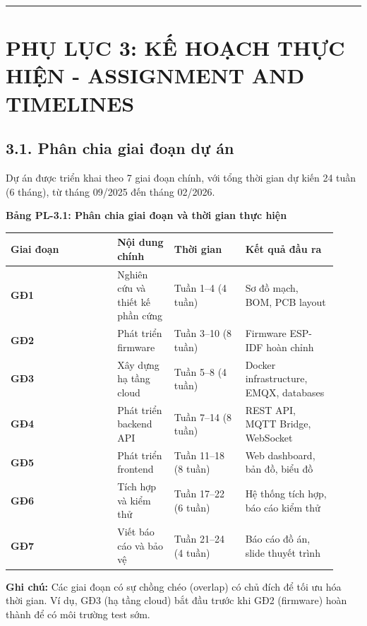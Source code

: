 \documentclass[13pt,a4paper]{extarticle}
\newcounter{none} %
\newcommand{\thesislongtableorignewline}{}
\let\thesislongtableorignewline\\
\renewcommand{\\}{\thesislongtableorignewline\hline}%
\let\\\thesislongtableorignewline
\newcommand{\appendixsection}[1]{\clearpage\section{#1}}
\newcommand{\thesistabletitle}[1]{%
  \begin{center}\textbf{#1}\end{center}%
}
\begin{document}
\begin{center}\rule{0.5\linewidth}{0.5pt}\end{center}

\appendixsection{PHỤ LỤC 3: KẾ HOẠCH THỰC HIỆN - ASSIGNMENT AND
TIMELINES}\label{phux1ee5-lux1ee5c-3-kux1ebf-houx1ea1ch-thux1ef1c-hiux1ec7n---assignment-and-timelines}

\subsection{3.1. Phân chia giai đoạn dự
án}\label{31-phuxe2n-chia-giai-ux111oux1ea1n-dux1ef1-uxe1n}

Dự án được triển khai theo 7 giai đoạn chính, với tổng thời gian dự kiến
24 tuần (6 tháng), từ tháng 09/2025 đến tháng 02/2026.

\thesistabletitle{Bảng PL-3.1: Phân chia giai đoạn và thời gian thực hiện}

{\def\LTcaptype{none} %
\begin{longtable}{|p{0.30\linewidth}|p{0.16\linewidth}|p{0.20\linewidth}|p{0.26\linewidth}|}
\hline \textbf{Giai đoạn} & \textbf{Nội dung chính} & \textbf{Thời gian} & \textbf{Kết quả đầu ra} \\
\hline
\endhead
\hline
\endlastfoot
\textbf{GĐ1} & Nghiên cứu và thiết kế phần cứng & Tuần 1--4 (4 tuần) &
Sơ đồ mạch, BOM, PCB layout \\
\textbf{GĐ2} & Phát triển firmware & Tuần 3--10 (8 tuần) & Firmware
ESP-IDF hoàn chỉnh \\
\textbf{GĐ3} & Xây dựng hạ tầng cloud & Tuần 5--8 (4 tuần) & Docker
infrastructure, EMQX, databases \\
\textbf{GĐ4} & Phát triển backend API & Tuần 7--14 (8 tuần) & REST API,
MQTT Bridge, WebSocket \\
\textbf{GĐ5} & Phát triển frontend & Tuần 11--18 (8 tuần) & Web
dashboard, bản đồ, biểu đồ \\
\textbf{GĐ6} & Tích hợp và kiểm thử & Tuần 17--22 (6 tuần) & Hệ thống
tích hợp, báo cáo kiểm thử \\
\textbf{GĐ7} & Viết báo cáo và bảo vệ & Tuần 21--24 (4 tuần) & Báo cáo
đồ án, slide thuyết trình \\
\end{longtable}
}

\textbf{Ghi chú:} Các giai đoạn có sự chồng chéo (overlap) có chủ đích
để tối ưu hóa thời gian. Ví dụ, GĐ3 (hạ tầng cloud) bắt đầu trước khi
GĐ2 (firmware) hoàn thành để có môi trường test sớm.
\end{document}
